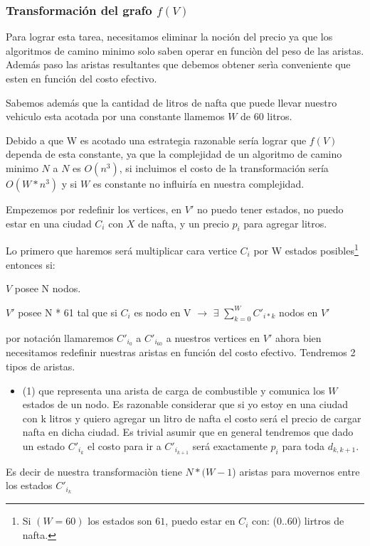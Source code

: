 \documentclass[12pt]{article}
\begin{document}
\subsubsection{Transformación del grafo $f(V)$}

Para lograr esta tarea, necesitamos eliminar la noción del precio ya que los algoritmos de camino minimo solo saben operar en funciòn del peso de las aristas. Además paso las aristas resultantes que debemos obtener serìa conveniente que esten en función del costo efectivo.

Sabemos además que la cantidad de litros de nafta que puede llevar nuestro vehiculo esta acotada por una constante llamemos $W$ de 60 litros. 

Debido a que W es acotado una estrategia razonable sería lograr que $f(V)$ dependa de esta constante, ya que la complejidad de un algoritmo de camino minimo $N$ a $N$ es $O(n^3)$, si incluimos el costo de la transformación sería $O(W * n^3)$ y si $W$ es constante no influiría en nuestra complejidad.

Empezemos por redefinir los vertices, en $V'$ no puedo tener estados, no puedo estar en una ciudad $C_i$ con $X$ de nafta, y un precio $p_i$ para agregar litros.

Lo primero que haremos será multiplicar cara vertice $C_i$ por W estados posibles\footnote{Si $(W = 60)$ los estados son $61$, puedo estar en $C_i$ con: (0..60) lirtros de nafta.} entonces si:

$V$ posee  N nodos. 

$V'$ posee N * 61 tal que si $C_i$ es nodo en V $\rightarrow$ $\exists$ $\sum_{k=0}^{W} C'_{i * k}$ nodos en $V'$

por notación llamaremos $C'_{i_0}$ a $C'_{i_{60}}$ a nuestros vertices en $V'$ ahora bien necesitamos redefinir nuestras aristas en función del costo efectivo. Tendremos 2 tipos de aristas.

\begin{itemize}
	\item (1) que representa una arista de carga de combustible y comunica los $W$ estados de un nodo. Es razonable considerar que si yo estoy en una ciudad con k litros y quiero agregar un litro de nafta el costo será el precio de cargar nafta en dicha ciudad. Es trivial asumir que en general tendremos que dado un estado $C'_{i_k}$ el costo para ir a $C'_{i_{k+1}}$ será exactamente $p_i$ para toda $d_{k,k+1}$.
\end{itemize}

Es decir de nuestra transformaciòn tiene  $N * (W - 1$) aristas para movernos entre los estados $C'_{i_k}$
\end{document}
